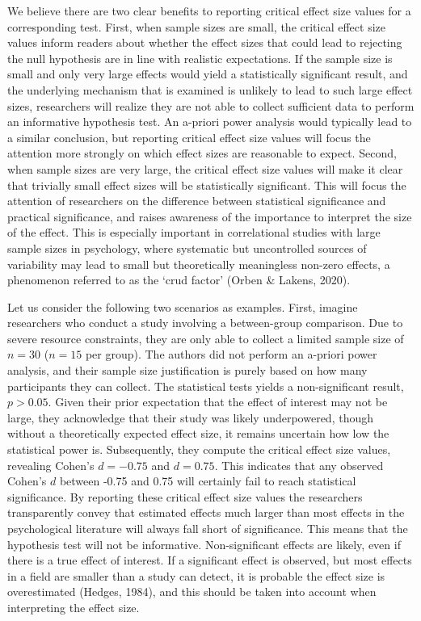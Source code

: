 \documentclass[
  man]{apa7}
\begin{document}
We believe there are two clear benefits to reporting critical effect size values for a corresponding test. First, when sample sizes are small, the critical effect size values inform readers about whether the effect sizes that could lead to rejecting the null hypothesis are in line with realistic expectations. If the sample size is small and only very large effects would yield a statistically significant result, and the underlying mechanism that is examined is unlikely to lead to such large effect sizes, researchers will realize they are not able to collect sufficient data to perform an informative hypothesis test. An a-priori power analysis would typically lead to a similar conclusion, but reporting critical effect size values will focus the attention more strongly on which effect sizes are reasonable to expect. Second, when sample sizes are very large, the critical effect size values will make it clear that trivially small effect sizes will be statistically significant. This will focus the attention of researchers on the difference between statistical significance and practical significance, and raises awareness of the importance to interpret the size of the effect. This is especially important in correlational studies with large sample sizes in psychology, where systematic but uncontrolled sources of variability may lead to small but theoretically meaningless non-zero effects, a phenomenon referred to as the `crud factor' (Orben \& Lakens, 2020).

Let us consider the following two scenarios as examples. First, imagine researchers who conduct a study involving a between-group comparison. Due to severe resource constraints, they are only able to collect a limited sample size of \(n = 30\) (\(n = 15\) per group). The authors did not perform an a-priori power analysis, and their sample size justification is purely based on how many participants they can collect. The statistical tests yields a non-significant result, \(p > 0.05\). Given their prior expectation that the effect of interest may not be large, they acknowledge that their study was likely underpowered, though without a theoretically expected effect size, it remains uncertain how low the statistical power is. Subsequently, they compute the critical effect size values, revealing Cohen's \(d = -0.75\) and \(d = 0.75\). This indicates that any observed Cohen's \(d\) between -0.75 and 0.75 will certainly fail to reach statistical significance. By reporting these critical effect size values the researchers transparently convey that estimated effects much larger than most effects in the psychological literature will always fall short of significance. This means that the hypothesis test will not be informative. Non-significant effects are likely, even if there is a true effect of interest. If a significant effect is observed, but most effects in a field are smaller than a study can detect, it is probable the effect size is overestimated (Hedges, 1984), and this should be taken into account when interpreting the effect size.
\end{document}
